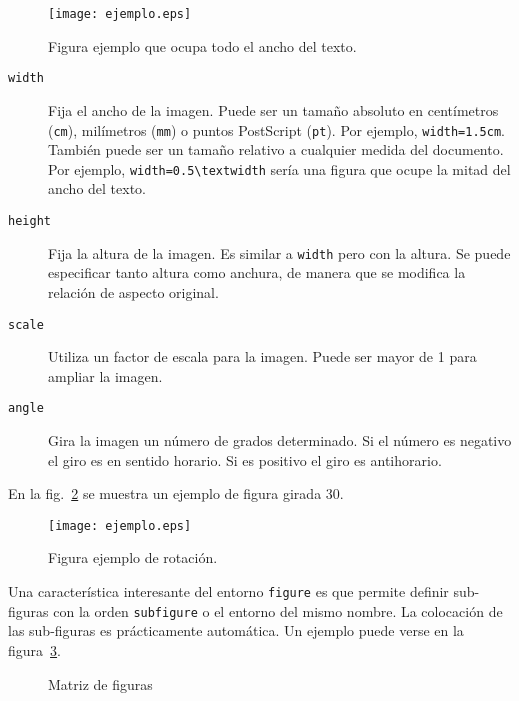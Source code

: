 \begin{figure}
\centering
\texttt{[image: ejemplo.eps]}
\caption{Figura ejemplo que ocupa todo el ancho del texto.}
\label{fig:figura-ejemplo-4}
\end{figure}

\begin{description}
\item[\texttt{width}]  Fija el ancho de la imagen.  Puede ser un tamaño absoluto en centímetros (\texttt{cm}), milímetros (\texttt{mm}) o puntos PostScript (\texttt{pt}).  Por ejemplo,  \verb|width=1.5cm|.  También puede ser un tamaño relativo a cualquier medida del documento.  Por ejemplo, \verb|width=0.5\textwidth| sería una figura que ocupe la mitad del ancho del texto.

\item[\texttt{height}] Fija la altura de la imagen.  Es similar a \texttt{width} pero con la altura.  Se puede especificar tanto altura como anchura, de manera que se modifica la relación de aspecto original.

\item[\texttt{scale}] Utiliza un factor de escala para la imagen.  Puede ser mayor de 1 para ampliar la imagen.

\item[\texttt{angle}] Gira la imagen un número de grados determinado.  Si el número es negativo el giro es en sentido horario.  Si es positivo el giro es antihorario.
\end{description}


En la fig.~\ref{fig:figura-angulo-30} se muestra un ejemplo de figura girada 30.

\begin{figure}[btp]
\centering
\texttt{[image: ejemplo.eps]}
\caption{Figura ejemplo de rotación.}
\label{fig:figura-angulo-30}
\end{figure}

Una característica interesante del entorno \texttt{figure} es que permite definir sub-figuras con la orden \texttt{subfigure} o el entorno del mismo nombre.  La colocación de las sub-figuras es prácticamente automática.  Un ejemplo puede verse en la figura~\ref{fig:matriz-figuras}.

\begin{figure}[htbp]
\centering
{}
\caption{Matriz de figuras} 
\label{fig:matriz-figuras}
\end{figure}

